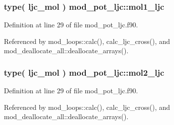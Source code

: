 \subsubsection[{\texorpdfstring{mol1\+\_\+ljc}{mol1_ljc}}]{\setlength{\rightskip}{0pt plus 5cm}type( {\bf ljc\+\_\+mol} ) mod\+\_\+pot\+\_\+ljc\+::mol1\+\_\+ljc}\hypertarget{namespacemod__pot__ljc_a840c66fc49efca8db3e2c54932a77356}{}\label{namespacemod__pot__ljc_a840c66fc49efca8db3e2c54932a77356}


Definition at line 29 of file mod\+\_\+pot\+\_\+ljc.\+f90.



Referenced by mod\+\_\+loops\+::calc(), calc\+\_\+ljc\+\_\+cross(), and mod\+\_\+deallocate\+\_\+all\+::deallocate\+\_\+arrays().

\subsubsection[{\texorpdfstring{mol2\+\_\+ljc}{mol2_ljc}}]{\setlength{\rightskip}{0pt plus 5cm}type( {\bf ljc\+\_\+mol} ) mod\+\_\+pot\+\_\+ljc\+::mol2\+\_\+ljc}\hypertarget{namespacemod__pot__ljc_a2b003eb4461125a250324cf11fdd50c7}{}\label{namespacemod__pot__ljc_a2b003eb4461125a250324cf11fdd50c7}


Definition at line 29 of file mod\+\_\+pot\+\_\+ljc.\+f90.



Referenced by mod\+\_\+loops\+::calc(), calc\+\_\+ljc\+\_\+cross(), and mod\+\_\+deallocate\+\_\+all\+::deallocate\+\_\+arrays().

